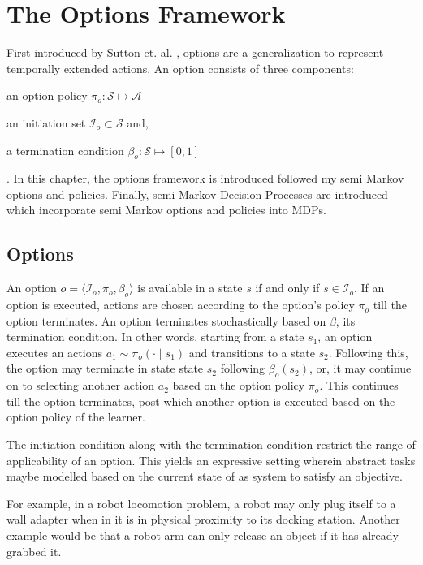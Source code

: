 \normallinespacing

\chapter{The Options Framework}

First introduced by Sutton et. al. \cite{sutton_between_1999}, options are a generalization to represent temporally extended actions.
An option consists of three components:
\begin{inparaenum}[(a)]
    \item an option policy $\pi_o : \mathcal{S} \mapsto \mathcal{A}$
    \item an initiation set $\mathcal{I}_o \subset \mathcal{S}$ and,
    \item a termination condition $\beta_o : \mathcal{S} \mapsto [0, 1]$
\end{inparaenum}.
In this chapter, the options framework is introduced followed my semi Markov options and policies. Finally, semi Markov Decision Processes are introduced which incorporate semi Markov options and policies into MDPs.

\section{Options}

An option $o = \langle \mathcal{I}_o, \pi_o, \beta_o \rangle$ is available in a state $s$ if and only if $s \in \mathcal{I}_o$.
If an option is executed, actions are chosen according to the option's policy $\pi_o$ till the option terminates.
An option terminates stochastically based on $\beta$, its termination condition.
In other words, starting from a state $s_1$, an option executes an actions $a_1 \sim \pi_o(\cdot \mid s_1)$ and transitions to a state $s_2$.
Following this, the option may terminate in state state $s_2$ following $\beta_o(s_2)$, or, it may continue on to selecting another action $a_2$ based on the option policy $\pi_o$.
This continues till the option terminates, post which another option is executed based on the option policy of the learner.

The initiation condition along with the termination condition restrict the range of applicability of an option.
This yields an expressive setting wherein abstract tasks maybe modelled based on the current state of as system to satisfy an objective.

For example, in a robot locomotion problem, a robot may only plug itself to a wall adapter when in it is in physical proximity to its docking station.
Another example would be that a robot arm can only release an object if it has already grabbed it.

